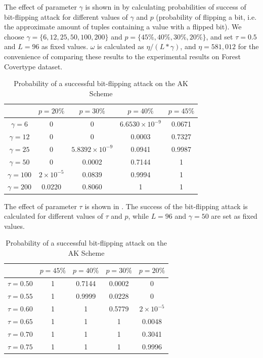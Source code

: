 The effect of parameter $\gamma$ is shown in  by calculating probabilities of success of bit-flipping attack for different values of $\gamma$ and $p$ (probability of flipping a bit, i.e. the approximate amount of tuples containing a value with a flipped bit).
We choose $\gamma=\{6, 12, 25, 50, 100, 200\}$ and $p=\{45\%, 40\%, 30\%, 20\%\}$, and set $\tau=0.5$ and $L=96$ as fixed values.
$\omega$ is calculated as $\eta/(L*\gamma)$, and $\eta=581,012$ for the convenience of comparing these results to the experimental results on Forest Covertype dataset.

\begin{table}[ht]
\centering

\caption{Probability of a successful bit-flipping attack on the AK Scheme}
\label{table:bit-flipping-ak}
\begin{tabular}{|c|c|c|c|c|} 
 \hline
   & \textbf{$p=20\%$} & \textbf{$p=30\%$} & \textbf{$p=40\%$} & \textbf{$p=45\%$} \\
 \hline
 $\gamma=6$ & 0 & 0 & $6.6530 \times 10^{-9}$ & 0.0671 \\
 \hline
 $\gamma=12$ & 0 & 0 & 0.0003 & 0.7327 \\
 \hline
 $\gamma=25$ & 0 & $5.8392\times 10^{-9}$ & 0.0941 & 0.9987 \\
 \hline
 $\gamma=50$ & 0 & 0.0002 & 0.7144 & 1 \\
 \hline
  $\gamma=100$ & $2\times 10^{-5}$ & 0.0839 & 0.9994 & 1 \\
  \hline
  $\gamma=200$ & 0.0220 & 0.8060 & 1 & 1 \\
 \hline
\end{tabular}
\end{table}

The effect of parameter $\tau$ is shown in .
The success of the bit-flipping attack is calculated for different values of $\tau$ and $p$, while $L=96$ and $\gamma=50$ are set as fixed values.

\begin{table}[ht]
\centering
\caption{Probability of a successful bit-flipping attack on the AK Scheme}
\label{table:bit-flipping-ak-tau}
\begin{tabular}{|c|c|c|c|c|} 
 \hline
 & \textbf{$p=45\%$} & \textbf{$p=40\%$} & \textbf{$p=30\%$} & \textbf{$p=20\%$} \\
 \hline
 $\tau=0.50$ & 1 & 0.7144 & 0.0002 & 0 \\
 \hline
 $\tau=0.55$ & 1 & 0.9999 & 0.0228 & 0 \\
 \hline
 $\tau=0.60$ & 1 & 1 & 0.5779 & $2\times 10^{-5}$ \\
 \hline
 $\tau=0.65$ & 1 & 1 & 1 & 0.0048 \\
 \hline
  $\tau=0.70$ & 1 & 1 & 1 & 0.3041 \\
  \hline
  $\tau=0.75$ & 1 & 1 & 1 & 0.9996 \\
 \hline
\end{tabular}
\end{table}

